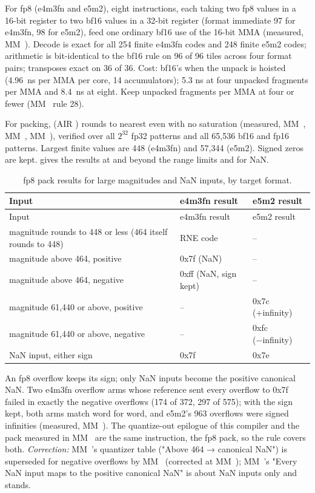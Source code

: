 For fp8 (e4m3fn and e5m2), eight  instructions, each
taking two fp8 values in a 16-bit register to two bf16 values in a 32-bit register (format immediate 97 for e4m3fn, 98
for e5m2), feed one ordinary bf16 use of the 16-bit MMA (measured, MM~). Decode is exact for all 254 finite e4m3fn codes and 248
finite e5m2 codes; arithmetic is bit-identical to the bf16 rule on 96 of 96 tiles across four format pairs;
transposes exact on 36 of 36. Cost: bf16's when the unpack is hoisted (4.96~ns per MMA per core, 14 accumulators); 5.3
ns at four unpacked fragments per MMA and 8.4~ns at eight. Keep unpacked fragments per MMA at four or fewer (MM~ rule
28).

For packing,  (AIR ) rounds to nearest even with no
saturation (measured, MM~, MM~, MM~), verified over all $2^{32}$ fp32 patterns and all 65,536
bf16 and fp16 patterns. Largest finite values are 448 (e4m3fn) and 57,344 (e5m2). Signed zeros are kept.  gives the
results at and beyond the range limits and for NaN.

\begin{xltabular}{\linewidth}{@{}>{\hsize}X>{\hsize}X>{\hsize}X@{}}
\caption{fp8 pack results for large magnitudes and NaN inputs, by target format.}\label{tab:fp8-pack-limits}\\
\toprule
Input & e4m3fn result & e5m2 result \\
\midrule
\endfirsthead
{}
\toprule
Input & e4m3fn result & e5m2 result \\
\midrule
\endhead
magnitude rounds to 448 or less (464 itself rounds to 448) & RNE code & – \\*
magnitude above 464, positive & 0x7f (NaN) & – \\*
magnitude above 464, negative & 0xff (NaN, sign kept) & – \\*
magnitude 61,440 or above, positive & – & 0x7c (+infinity) \\*
magnitude 61,440 or above, negative & – & 0xfc (−infinity) \\*
NaN input, either sign & 0x7f & 0x7e \\*
\bottomrule
\end{xltabular}

An fp8 overflow keeps its sign; only NaN inputs become the positive canonical NaN. Two e4m3fn overflow arms whose
reference sent every overflow to 0x7f failed in exactly the negative overflows (174 of 372, 297 of 575); with the
sign kept, both arms match word for word, and e5m2's 963 overflows were signed infinities (measured, MM~). The
quantize-out epilogue of this compiler and the pack measured in MM~ are the same instruction, the fp8 pack, so the
rule covers both. \emph{Correction:} MM~'s quantizer table ("Above 464 → canonical NaN") is superseded for negative
overflows by MM~ (corrected at MM~); MM~'s "Every NaN input maps to the positive canonical NaN" is about
NaN inputs only and stands.


